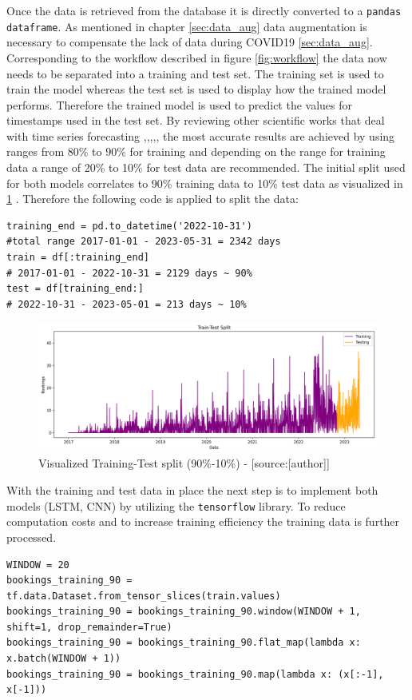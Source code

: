 Once the data is retrieved from the database it is directly converted to a \verb|pandas dataframe|. As mentioned in chapter \ref{sec:data_aug} data augmentation is necessary to compensate the lack of data during COVID19 \ref{sec:data_aug}. Corresponding to the workflow described in figure \ref{fig:workflow} the data now needs to be separated into a training and test set. The training set is used to train the model whereas the test set is used to display how the trained model performs. Therefore the trained model is used to predict the values for timestamps used in the test set. By reviewing other scientific works that deal with time series forecasting \cite{1d_cnn},\cite{cnn_vechicle},\cite{cnn_intro},\cite{lstm_overcome_rnn_problem},\cite{lstm_module},\cite{lstm_stock} the most accurate results are achieved by using ranges from 80\% to 90\% for training and depending on the range for training data a range of 20\% to 10\% for test data are recommended. The initial split used for both models correlates to 90\% training data to 10\% test data as visualized in \ref{fig:training_test} . Therefore the following code is applied to split the data:
\begin{lstlisting}
training_end = pd.to_datetime('2022-10-31')
#total range 2017-01-01 - 2023-05-31 = 2342 days
train = df[:training_end]
# 2017-01-01 - 2022-10-31 = 2129 days ~ 90%
test = df[training_end:]
# 2022-10-31 - 2023-05-01 = 213 days ~ 10%
\end{lstlisting}
\begin{figure}[H]
	\centering
		\includegraphics[width=14cm]{images/training_test}
	\caption{Visualized Training-Test split (90\%-10\%) - [source:[author]]}
	\label{fig:training_test}
\end{figure}
With the training and test data in place the next step is to implement both models (LSTM, CNN) by utilizing the \verb|tensorflow| library. To reduce computation costs and to increase training efficiency the training data is further processed.
\begin{lstlisting}
WINDOW = 20
bookings_training_90 = tf.data.Dataset.from_tensor_slices(train.values)
bookings_training_90 = bookings_training_90.window(WINDOW + 1, shift=1, drop_remainder=True)
bookings_training_90 = bookings_training_90.flat_map(lambda x: x.batch(WINDOW + 1))
bookings_training_90 = bookings_training_90.map(lambda x: (x[:-1], x[-1]))
\end{lstlisting}
